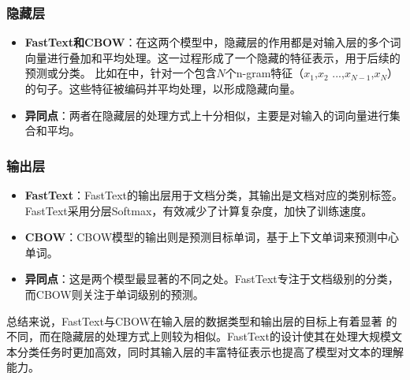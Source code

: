 \subsubsection*{隐藏层}
\begin{itemize}
    \item \textbf{FastText和CBOW}：在这两个模型中，隐藏层的作用都是对输入层的多个词向量进行叠加和平均处理。这一过程形成了一个隐藏的特征表示，用于后续的预测或分类。
    比如在中，针对一个包含$N$个n-gram特征（$x_{1}$,$x_{2}$ ...,$x_{N-1}$,$x_{N}$）的句子。这些特征被编码并平均处理，以形成隐藏向量。
    \item \textbf{异同点}：两者在隐藏层的处理方式上十分相似，主要是对输入的词向量进行集合和平均。
\end{itemize}

\subsubsection*{输出层}
\begin{itemize}
    \item \textbf{FastText}：FastText的输出层用于文档分类，其输出是文档对应的类别标签。FastText采用分层Softmax，有效减少了计算复杂度，加快了训练速度。
    \item \textbf{CBOW}：CBOW模型的输出则是预测目标单词，基于上下文单词来预测中心单词。
    \item \textbf{异同点}：这是两个模型最显著的不同之处。FastText专注于文档级别的分类，而CBOW则关注于单词级别的预测。
\end{itemize}

总结来说，FastText与CBOW在输入层的数据类型和输出层的目标上有着显著
的不同，而在隐藏层的处理方式上则较为相似。FastText的设计使其在处理大规模文
本分类任务时更加高效，同时其输入层的丰富特征表示也提高了模型对文本的理解能力。

%

